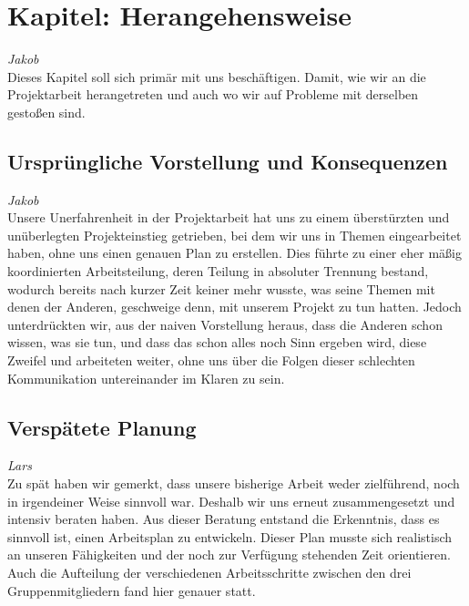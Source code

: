 \documentclass[12pt,a4paper,bibliography=totocnumbered,listof=totocnumbered]{scrartcl}
\begin{document}
\onehalfspacing
\renewcommand{\thesection}{\arabic{section}}
\renewcommand{\theHsection}{\arabic{section}}
\setcounter{section}{0}
\setcounter{page}{1}

\section{Kapitel: Herangehensweise}
\emph{Jakob}\\
Dieses Kapitel soll sich primär mit uns beschäftigen.
Damit, wie wir an die Projektarbeit herangetreten und auch wo wir auf Probleme mit derselben gestoßen sind.

\subsection{Ursprüngliche Vorstellung und Konsequenzen}
\label{sec:Vorstellung}
\emph{Jakob}\\
Unsere Unerfahrenheit in der Projektarbeit hat uns zu einem überstürzten und unüberlegten Projekteinstieg getrieben, bei dem wir uns in Themen eingearbeitet haben, ohne uns einen genauen Plan zu erstellen.
Dies führte zu einer eher mäßig koordinierten Arbeitsteilung, deren Teilung in absoluter Trennung bestand, wodurch bereits nach kurzer Zeit keiner mehr wusste, was seine Themen mit denen der Anderen, geschweige denn, mit unserem Projekt zu tun hatten.
Jedoch unterdrückten wir, aus der naiven Vorstellung heraus, dass die Anderen schon wissen, was sie tun, und dass das schon alles noch Sinn ergeben wird, diese Zweifel und arbeiteten weiter, ohne uns über die Folgen dieser schlechten Kommunikation untereinander im Klaren zu sein.

\subsection{Verspätete Planung}
\emph{Lars}\\
Zu spät haben wir gemerkt, dass unsere bisherige Arbeit weder zielführend, noch in irgendeiner Weise sinnvoll war. Deshalb wir uns erneut zusammengesetzt und intensiv beraten haben. Aus dieser Beratung entstand die Erkenntnis, dass es sinnvoll ist, einen Arbeitsplan zu entwickeln. Dieser Plan musste sich realistisch an unseren Fähigkeiten und der noch zur Verfügung stehenden Zeit orientieren. Auch die Aufteilung der verschiedenen Arbeitsschritte zwischen den  drei Gruppenmitgliedern fand hier genauer statt.
\end{document}
